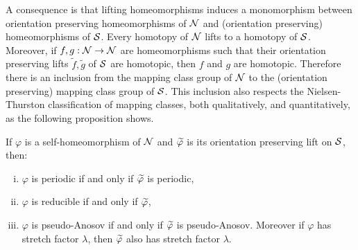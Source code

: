 A consequence is that lifting homeomorphisms induces a monomorphism between orientation preserving homeomorphisms of $\mathcal{N}$ and (orientation preserving) homeomorphisms of $\mathcal{S}$.
Every homotopy of $\mathcal{N}$ lifts to a homotopy of $\mathcal{S}$.
Moreover, if $f,g:\mathcal{N}\to\mathcal{N}$ are homeomorphisms such that their orientation preserving lifts $\widetilde{f},\widetilde{g}$ of $\mathcal{S}$ are homotopic, then $f$ and $g$ are homotopic.
Therefore there is an inclusion from the mapping class group of $\mathcal{N}$ to the (orientation preserving) mapping class group of $\mathcal{S}$.
This inclusion also respects the Nielsen-Thurston classification of mapping classes, both qualitatively, and quantitatively, as the following proposition shows.
\begin{prop}
  \label{prop:2}
  If $\varphi$ is a self-homeomorphism of $\mathcal{N}$ and $\widetilde{\varphi}$ is its orientation preserving lift on $\mathcal{S}$, then:
  \begin{enumerate}[(i)]
  \item $\varphi$ is periodic if and only if $\widetilde{\varphi}$ is periodic,
  \item $\varphi$ is reducible if and only if $\widetilde{\varphi}$,
  \item $\varphi$ is pseudo-Anosov if and only if $\widetilde{\varphi}$ is pseudo-Anosov.  Moreover if $\varphi$ has stretch factor $\lambda$, then $\widetilde{\varphi}$ also has stretch factor $\lambda$.
  \end{enumerate}
\end{prop}
